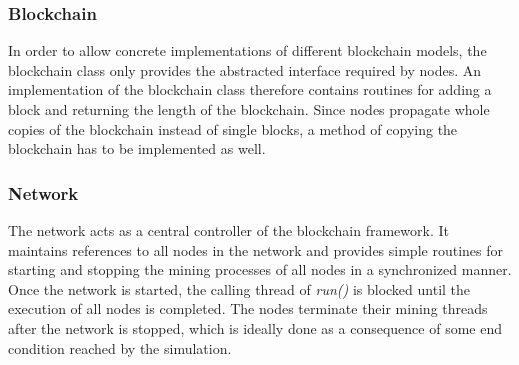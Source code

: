 \documentclass[a4paper,12pt,twoside]{report}
\begin{document}
\subsubsection{Blockchain}
In order to allow concrete implementations of different blockchain models, the blockchain class only provides the abstracted interface required by nodes. An implementation of the blockchain class therefore contains routines for adding a block and returning the length of the blockchain. Since nodes propagate whole copies of the blockchain instead of single blocks, a method of copying the blockchain has to be implemented as well.

\subsubsection{Network}
The network acts as a central controller of the blockchain framework. It maintains references to all nodes in the network and provides simple routines for starting and stopping the mining processes of all nodes in a synchronized manner. Once the network is started, the calling thread of \textit{run()} is blocked until the execution of all nodes is completed. The nodes terminate their mining threads after the network is stopped, which is ideally done as a consequence of some end condition reached by the simulation.
\end{document}

